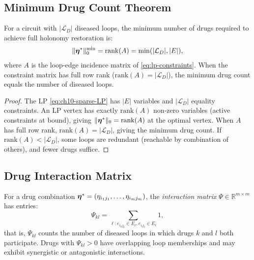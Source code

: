 \subsection{Minimum Drug Count Theorem}

\begin{theorem}
\label{thm:min-drug-count}
For a circuit with $|\mathcal{L}_D|$ diseased loops, the minimum number of
drugs required to achieve full holonomy restoration is:
\[
  \|\boldsymbol{\eta}^*\|_0^{\min} = \mathrm{rank}(A) = \min(|\mathcal{L}_D|, |E|),
\]
where $A$ is the loop-edge incidence matrix of \eqref{eq:lp-constraints}.
When the constraint matrix has full row rank ($\mathrm{rank}(A) = |\mathcal{L}_D|$),
the minimum drug count equals the number of diseased loops.
\end{theorem}

\begin{proof}
The LP \eqref{eq:ch10-sparse-LP} has $|E|$ variables and $|\mathcal{L}_D|$
equality constraints.  An LP vertex has exactly $\mathrm{rank}(A)$ non-zero
variables (active constraints at bound), giving $\|\boldsymbol{\eta}^*\|_0 = \mathrm{rank}(A)$
at the optimal vertex.  When $A$ has full row rank, $\mathrm{rank}(A) = |\mathcal{L}_D|$,
giving the minimum drug count.  If $\mathrm{rank}(A) < |\mathcal{L}_D|$, some
loops are redundant (reachable by combination of others), and fewer drugs suffice.
\end{proof}

\subsection{Drug Interaction Matrix}

\begin{definition}
\label{def:drug-interaction}
For a drug combination $\boldsymbol{\eta}^* = (\eta_{i_1j_1}, \ldots, \eta_{i_mj_m})$,
the \emph{interaction matrix} $\Psi \in \mathbb{R}^{m \times m}$ has entries:
\[
  \Psi_{kl} = \sum_{\ell : e_{i_kj_k} \in E_\ell, e_{i_lj_l} \in E_\ell} 1,
\]
that is, $\Psi_{kl}$ counts the number of diseased loops in which drugs $k$
and $l$ both participate.  Drugs with $\Psi_{kl} > 0$ have overlapping
loop memberships and may exhibit synergistic or antagonistic interactions.
\end{definition}

